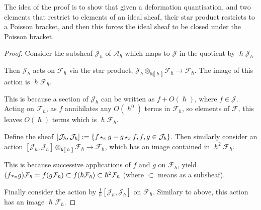     The idea of the proof is to show that given a deformation quantisation, and two elements that restrict to elements of an ideal sheaf, their star product restricts to a Poisson bracket, and then this forces the ideal sheaf to be closed under the Poisson bracket. 

    \begin{proof}
    Consider the subsheaf \(\mathcal{J}_\hslash\)  of \(\mathcal{A}_{\hslash}\) which  maps to \( \mathcal{J}\) in the quotient by \(\hslash \mathcal{J}_{\hslash}\)
    
    Then \( \mathcal{J}_\hslash\) acts on \( \mathcal{F}_\hslash\) via the star product, 
    \( \mathcal{J}_\hslash \otimes_{\mathbf{k} \lBrack \hslash \rBrack } \mathcal{F}_\hslash \rightarrow  \mathcal{F}_\hslash\).  The image of this action is \( \hslash \mathcal{F}_\hslash\).
    
    This is because a section of \( \mathcal{J}_{\hslash}\) can be written as \( f + O(\hslash)\), where \(f \in \mathcal{J}\). Acting on \( \mathcal{F}_{\hslash}\), as \(f\) annihilates any \( O(\hslash^0)\) terms in \( \mathcal{F}_{\hslash}\), so elements of \( \mathcal{F}\), this leaves \( O(\hslash)\) terms which is \(\hslash \mathcal{F}_{\hslash}\).
    
    Define the sheaf \(  [\mathcal{J}_{\hslash},\mathcal{J}_{\hslash} ]:=  \{  f \, \starp_{\pi} \, g - g \, \starp_{\pi}\,  f, f,g \in \mathcal{J}_{\hslash}\}\). Then similarly consider an action 
    \(  [\mathcal{J}_\hslash  ,   \mathcal{J}_\hslash  ]  \otimes_{\mathbf{k}\lBrack\hslash\rBrack} \mathcal{F}_\hslash \rightarrow  \mathcal{F}_\hslash\), which has an image contained in \( \hslash^2 \mathcal{F}_{\hslash}\).
    
    This is because successive applications of \(f\) and \(g\) on \( \mathcal{F}_{\hslash}\), yield \( (f \starp_{\pi} g) \mathcal{F}_{\hslash} = f ( g \mathcal{F}_{\hslash}) \subset f ( \hslash \mathcal{F}_{\hslash} ) \subset \hslash^2 \mathcal{F}_{\hslash}\) (where \( \subset\) means as a subsheaf).
    
    
    Finally consider the action by
    \( \frac{1}{\hslash} [ \mathcal{J}_\hslash, \mathcal{J}_\hslash ] \) on \( \mathcal{F}_{\hslash}\). Similary to above, this action has an image \( \hslash \mathcal{F}_{\hslash}\).
    

\end{proof}
